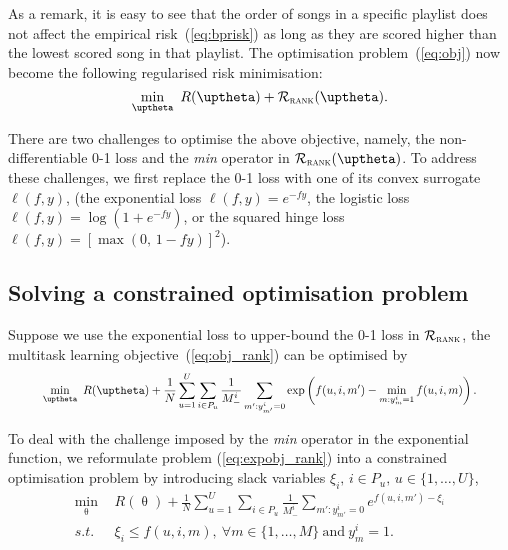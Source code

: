 As a remark, it is easy to see that the order of songs in a specific playlist does not affect the empirical 
risk~(\ref{eq:bprisk}) as long as they are scored higher than the lowest scored song in that playlist.
The optimisation problem~(\ref{eq:obj}) now become the following regularised risk minimisation:
\begin{equation}
\label{eq:obj_rank}
\min_\uptheta \ R(\uptheta) + \RCal_\textsc{rank}(\uptheta).
\end{equation}

There are two challenges to optimise the above objective,
namely, the non-differentiable 0-1 loss and the \emph{min} operator in $\RCal_\textsc{rank}(\uptheta)$.
To address these challenges, we first replace the 0-1 loss with one of its convex surrogate $\ell(f, y)$,
(\eg the exponential loss $\ell(f, y) = e^{-fy}$, the logistic loss $\ell(f, y) = \log(1 + e^{-fy})$,
or the squared hinge loss $\ell(f, y) = [\max(0, \, 1 - fy)]^2$).



\subsection{Solving a constrained optimisation problem}

Suppose we use the exponential loss to upper-bound the 0-1 loss in $\mathcal{R}_\textsc{rank}$,
the multitask learning objective~(\ref{eq:obj_rank}) can be optimised by
\begin{equation}
\label{eq:expobj_rank}
\resizebox{.9\linewidth}{!}{$\displaystyle
\min_{\uptheta} \ R(\uptheta) + \frac{1}{N} \sum_{u=1}^U \sum_{i \in P_u} \frac{1}{M_-^i} 
                  \sum_{m': y_{m'}^i = 0} \exp \left(f(u, i, m') - \min_{m: y_m^i = 1} f(u, i, m) \right).
$}
\end{equation}

To deal with the challenge imposed by the \emph{min} operator in the exponential function, 
we reformulate problem (\ref{eq:expobj_rank}) into a constrained optimisation problem by 
introducing slack variables $\xi_i, \, i \in P_u, \, u \in \{1,\dots,U\}$,
\begin{equation}
\label{eq:expobj_cons}
\begin{aligned}
\min_{\uptheta} \ \, & R(\uptheta) + \frac{1}{N} \sum_{u=1}^U \sum_{i \in P_u} \frac{1}{M_-^i} \sum_{m': y_{m'}^i = 0} e^{f(u, i, m') - \xi_i} \\
s.t. \ \, & \xi_i \le f(u, i, m), \ \forall m \in \{1,\dots,M\} \ \text{and} \ y_m^i = 1.
\end{aligned}
\end{equation}

